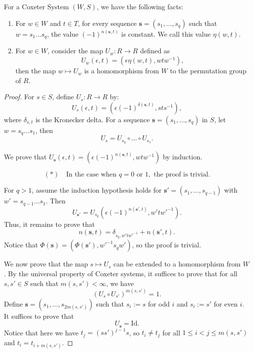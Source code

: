 \documentclass[../main.tex]{subfiles}
\begin{document}
\begin{lemma}
    For a Coxeter System $(W, S)$, we have the following facts:
    
    \begin{enumerate}
        \item For $w \in W$ and $t \in T$, for every sequence $\mathbf{s} = (s_1, \dots, s_q)$ such that $w = s_1 \dots s_q$, the value $(-1)^{n(\mathbf{s}, t)}$ is constant. We call this value $\eta(w, t)$.
        \item For $w \in W$, consider the map $U_w : R \rightarrow R$ defined as
        \[
            U_w(\epsilon, t) = (\epsilon \eta(w, t), w t w^{-1}),
            \]
            then the map $w \mapsto U_w$ is a homomorphism from $W$ to the permutation group of $R$.
        \end{enumerate}
    \begin{proof}
        For $s \in S$, define $U_s : R \rightarrow R$ by:
        \[
        U_s(\epsilon, t) = (\epsilon (-1)^{\delta(\mathbf{s}, t)}, s t s^{-1}),
        \]
        where $\delta_{s,t}$ is the Kronecker delta. For a sequence $\mathbf{s} = (s_1, \dots, s_q)$ in $S$, let $w = s_q \dots s_1$, then
        \[
        U_s = U_{s_q} \circ \dots \circ U_{s_1}.
        \]

        We prove that $U_{\mathbf{s}}(\epsilon, t) = (\epsilon (-1)^{n(\mathbf{s}, t)}, w t w^{-1})$ by induction. 

        \[
        (*) \quad \text{In the case when } q = 0 \text{ or } 1, \text{ the proof is trivial.}
        \]

        For $q > 1$, assume the induction hypothesis holds for $\mathbf{s'} = (s_1, \dots, s_{q-1})$ with $w' = s_{q-1} \dots s_1$. Then
        \[
        U_{\mathbf{s'}} = U_{s_q} (\epsilon (-1)^{n(\mathbf{s'}, t)}, w' t w'^{-1}).
        \]
        Thus, it remains to prove that
        \[
        n(\mathbf{s}, t) = \delta_{s_q, w' t w'^{-1}} + n(\mathbf{s'}, t).
        \]
        Notice that $\Phi(\mathbf{s}) = (\Phi(\mathbf{s'}), w'^{-1} s_q w')$, so the proof is trivial.

        We now prove that the map $s \mapsto U_s$ can be extended to a homomorphism from $W$. By the universal property of Coxeter systems, it suffices to prove that for all $s, s' \in S$ such that $m(s, s') < \infty$, we have
        \[
        (U_s \circ U_{s'})^{m(s, s')} = 1.
        \]
        Define $\mathbf{s} = (s_1, \dots, s_{2m(s, s')})$ such that $s_i := s$ for odd $i$ and $s_i := s'$ for even $i$. It suffices to prove that
        \[
        U_{\mathbf{s}} = \text{Id}.
        \]
        Notice that here we have $t_j = (ss')^{j-1} s$, so $t_i \neq t_j$ for all $1 \leq i < j \leq m(s, s')$ and $t_i = t_{i + m(s, s')}$.


\end{proof}
\end{lemma}
\end{document}

